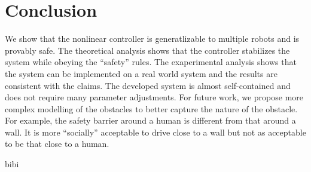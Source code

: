 \documentclass[conference]{IEEEtran}
\begin{document}
\section{Conclusion}
We show that the nonlinear controller is generatlizable to multiple robots and is provably safe. The theoretical analysis shows that the controller stabilizes the system while obeying the ``safety'' rules. The exaperimental analysis shows that the system can be implemented on a real world system and the results are consistent with the claims. The developed system is almost self-contained and does not require many parameter adjustments. 
For future work, we propose more complex modelling of the obstacles to better capture the nature of the obstacle. For example, the safety barrier around a human is different from that around a wall. It is more ``socially'' acceptable to drive close to a wall but not as acceptable to be that close to a human.

 {bibi}



\end{document}
